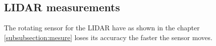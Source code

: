 %
%

\subsection{LIDAR measurements}\label{subsection:lidarmeaurment}
The rotating sensor for the LIDAR have as shown in the chapter \ref{subsubsection:mesure} loses its accuracy the faster the sensor moves.

